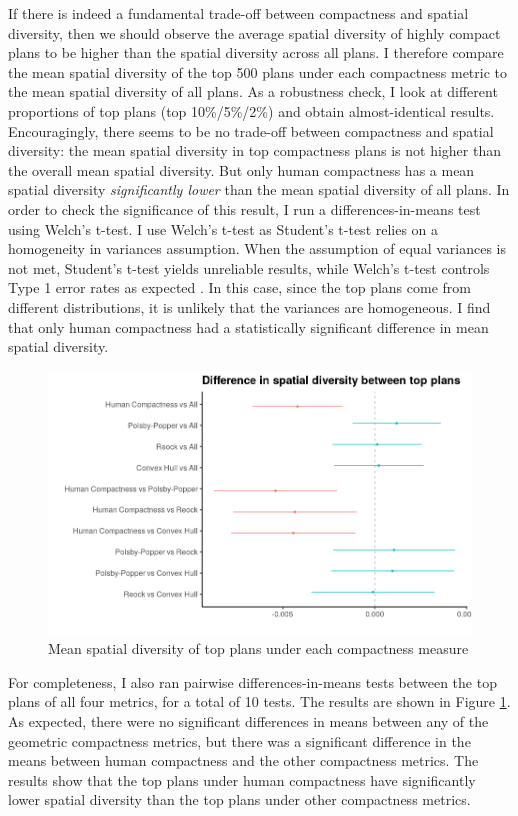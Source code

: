 \documentclass[]{article}
\begin{document}
If there is indeed a fundamental trade-off between compactness and
spatial diversity, then we should observe the average spatial diversity
of highly compact plans to be higher than the spatial diversity across
all plans. I therefore compare the mean spatial diversity of the top 500
plans under each compactness metric to the mean spatial diversity of all
plans. As a robustness check, I look at different proportions of top
plans (top 10\%/5\%/2\%) and obtain almost-identical results.
Encouragingly, there seems to be no trade-off between compactness and
spatial diversity: the mean spatial diversity in top compactness plans
is not higher than the overall mean spatial diversity. But only human
compactness has a mean spatial diversity \emph{significantly lower} than
the mean spatial diversity of all plans. In order to check the
significance of this result, I run a differences-in-means test using
Welch's t-test. I use Welch's t-test as Student's t-test relies on a
homogeneity in variances assumption. When the assumption of equal
variances is not met, Student's t-test yields unreliable results, while
Welch's t-test controls Type 1 error rates as expected
\citep{delacre2017}. In this case, since the top plans come from
different distributions, it is unlikely that the variances are
homogeneous. I find that only human compactness had a statistically
significant difference in mean spatial diversity.

\begin{figure}
\centering
\includegraphics{../30_results/diff_in_means.png}
\caption{Mean spatial diversity of top plans under each compactness
measure \label{diff_in_means}}
\end{figure}

For completeness, I also ran pairwise differences-in-means tests between
the top plans of all four metrics, for a total of 10 tests. The results
are shown in Figure \ref{diff_in_means}. As expected, there were no
significant differences in means between any of the geometric
compactness metrics, but there was a significant difference in the means
between human compactness and the other compactness metrics. The results
show that the top plans under human compactness have significantly lower
spatial diversity than the top plans under other compactness metrics.
\end{document}

